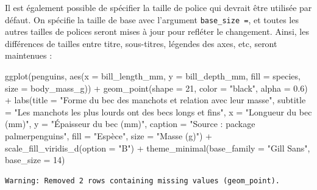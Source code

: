 \documentclass[
  letterpaper,
  DIV=11,
  numbers=noendperiod]{scrreprt}
\newenvironment{Shaded}{\begin{snugshade}}{\end{snugshade}}
\newcommand{\AttributeTok}[1]{\textcolor[rgb]{0.40,0.45,0.13}{#1}}
\newcommand{\DecValTok}[1]{\textcolor[rgb]{0.68,0.00,0.00}{#1}}
\newcommand{\FloatTok}[1]{\textcolor[rgb]{0.68,0.00,0.00}{#1}}
\newcommand{\FunctionTok}[1]{\textcolor[rgb]{0.28,0.35,0.67}{#1}}
\newcommand{\NormalTok}[1]{\textcolor[rgb]{0.00,0.23,0.31}{#1}}
\newcommand{\SpecialCharTok}[1]{\textcolor[rgb]{0.37,0.37,0.37}{#1}}
\newcommand{\StringTok}[1]{\textcolor[rgb]{0.13,0.47,0.30}{#1}}
\begin{document}
Il est également possible de spécifier la taille de police qui devrait
être utilisée par défaut. On spécifie la taille de base avec l'argument
\texttt{base\_size\ =}, et toutes les autres tailles de polices seront
mises à jour pour refléter le changement. Ainsi, les différences de
tailles entre titre, sous-titres, légendes des axes, etc, seront
maintenues :

\begin{Shaded}
\begin{Highlighting}[]
\FunctionTok{ggplot}\NormalTok{(penguins, }\FunctionTok{aes}\NormalTok{(}\AttributeTok{x =}\NormalTok{ bill\_length\_mm, }\AttributeTok{y =}\NormalTok{ bill\_depth\_mm,}
                     \AttributeTok{fill =}\NormalTok{ species, }\AttributeTok{size =}\NormalTok{ body\_mass\_g)) }\SpecialCharTok{+}
  \FunctionTok{geom\_point}\NormalTok{(}\AttributeTok{shape =} \DecValTok{21}\NormalTok{, }\AttributeTok{color =} \StringTok{"black"}\NormalTok{, }\AttributeTok{alpha =} \FloatTok{0.6}\NormalTok{) }\SpecialCharTok{+}
  \FunctionTok{labs}\NormalTok{(}\AttributeTok{title =} \StringTok{"Forme du bec des manchots et relation avec leur masse"}\NormalTok{,}
       \AttributeTok{subtitle =} \StringTok{"Les manchots les plus lourds ont des becs longs et fins"}\NormalTok{,}
       \AttributeTok{x =} \StringTok{"Longueur du bec (mm)"}\NormalTok{,}
       \AttributeTok{y =} \StringTok{"Épaisseur du bec (mm)"}\NormalTok{,}
       \AttributeTok{caption =} \StringTok{"Source :  package \textquotesingle{}palmerpenguins\textquotesingle{}"}\NormalTok{,}
       \AttributeTok{fill =} \StringTok{"Espèce"}\NormalTok{,}
       \AttributeTok{size =} \StringTok{"Masse (g)"}\NormalTok{) }\SpecialCharTok{+}
  \FunctionTok{scale\_fill\_viridis\_d}\NormalTok{(}\AttributeTok{option =} \StringTok{"B"}\NormalTok{) }\SpecialCharTok{+}
  \FunctionTok{theme\_minimal}\NormalTok{(}\AttributeTok{base\_family =} \StringTok{"Gill Sans"}\NormalTok{, }\AttributeTok{base\_size =} \DecValTok{14}\NormalTok{)}
\end{Highlighting}
\end{Shaded}

\begin{verbatim}
Warning: Removed 2 rows containing missing values (geom_point).
\end{verbatim}
\end{document}

